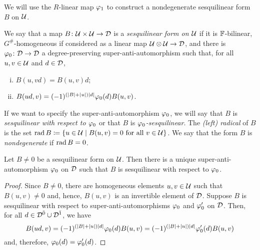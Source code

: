 We will use
the $R$-linear map
$\varphi_1$ to construct a nondegenerate sesquilinear form $B$ on $\mathcal U$.

\begin{defi}\label{def:sesquilinear-form}
	We say that a map $B\colon \mathcal U \times \mathcal U \to \mathcal{D}$ is a \emph{sesquilinear form on $\mathcal U$} if it is $\mathbb{F}$-bilinear, $G^\#$-homogeneous if considered as a linear map $\mathcal U\otimes \mathcal U \to \mathcal{D}$, and there is $\varphi_0\colon \mathcal{D} \to \mathcal{D}$ a degree-preserving su\-per\--an\-ti\--auto\-mor\-phism such that, for all $u,v \in \mathcal U$ and $d\in \mathcal{D}$,
	\begin{enumerate}[(i)]
		\item $B(u,vd) = B(u,v)d$; \label{enum:linear-on-the-second}
		\item $B(ud, v) = (-1)^ {(|B| + |u|)|d|}\varphi_0(d) B(u, v)$. \label{enum:vphi0-linear-on-the-first}
	\end{enumerate}
	If we want to specify the super-anti-automorphism $\varphi_0$, we will say that $B$ is \emph{sesquilinear with respect to $\varphi_0$} or that $B$ is \emph{$\varphi_0$-sesquilinear}.
	The \emph{(left) radical} of $B$ is the set $\operatorname{rad} B \coloneqq \{u\in \mathcal U \mid B(u, v) = 0 \text{ for all } v\in \mathcal U\}$. 
	We say that the form $B$ is \emph{nondegenerate} if $\operatorname{rad} B = 0$.
\end{defi}


\begin{lemma}\label{lemma:B-determines-vphi_0}
	Let $B \neq 0$ be a sesquilinear form on $\mathcal U$.
	Then there is a unique super-anti-automorphism $\varphi_0$ on $\mathcal{D}$ such that $B$ is sesquilinear with respect to $\varphi_0$.
\end{lemma}

\begin{proof}
	Since $B\neq 0$, there are homogeneous elements $u, v\in \mathcal U$ such that $B(u,v) \neq 0$ and, hence, $B(u,v)$ is an invertible element of $\mathcal{D}$.
	Suppose $B$ is sesquilinear with respect to super-anti-automorphisms $\varphi_0$ and $\varphi_0'$ on $\mathcal{D}$.
	Then, for all $d\in \mathcal{D}^{\bar0} \cup \mathcal{D}^{\bar1}$, we have
	\[ B(ud,v) = (-1)^ {(|B| + |u|)|d|} \varphi_0(d) B(u,v) = (-1)^ {(|B| + |u|)|d|} \varphi_0'(d) B(u,v) \]
	and, therefore, $\varphi_0(d) = \varphi_0'(d)$.
\end{proof}

